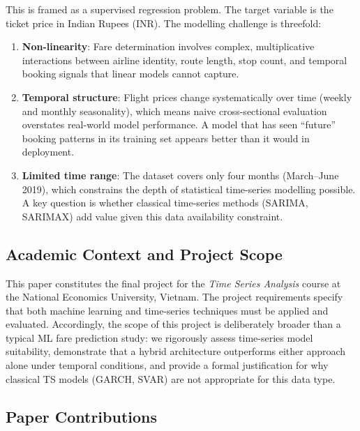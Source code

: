 \documentclass[12pt, a4paper]{article}
\begin{document}
This is framed as a supervised regression problem.  The target variable is the
ticket price in Indian Rupees (INR).  The modelling challenge is threefold:
\begin{enumerate}
    \item \textbf{Non-linearity}: Fare determination involves complex,
    multiplicative interactions between airline identity, route length,
    stop count, and temporal booking signals that linear models cannot capture.

    \item \textbf{Temporal structure}: Flight prices change systematically over
    time (weekly and monthly seasonality), which means naive cross-sectional
    evaluation overstates real-world model performance.  A model that has seen
    ``future'' booking patterns in its training set appears better than it would
    in deployment.

    \item \textbf{Limited time range}: The dataset covers only four months
    (March--June 2019), which constrains the depth of statistical time-series
    modelling possible.  A key question is whether classical time-series methods
    (SARIMA, SARIMAX) add value given this data availability constraint.
\end{enumerate}

\subsection{Academic Context and Project Scope}

This paper constitutes the final project for the \textit{Time Series Analysis}
course at the National Economics University, Vietnam.  The project requirements
specify that both machine learning and time-series techniques must be applied
and evaluated.  Accordingly, the scope of this project is deliberately broader
than a typical ML fare prediction study: we rigorously assess time-series
model suitability, demonstrate that a hybrid architecture outperforms either
approach alone under temporal conditions, and provide a formal justification for
why classical TS models (GARCH, SVAR) are not appropriate for this data type.

\subsection{Paper Contributions}
\end{document}
